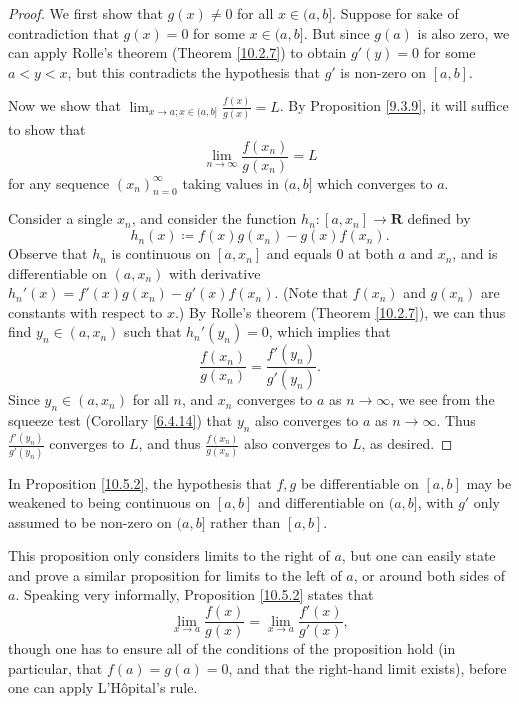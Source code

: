 \begin{proof}
    We first show that \(g(x) \neq 0\) for all \(x \in (a, b]\).
    Suppose for sake of contradiction that \(g(x) = 0\) for some \(x \in (a, b]\).
    But since \(g(a)\) is also zero, we can apply Rolle's theorem (Theorem \ref{10.2.7}) to obtain \(g'(y) = 0\) for some \(a < y < x\), but this contradicts the hypothesis that \(g'\) is non-zero on \([a, b]\).

    Now we show that \(\lim_{x \to a ; x \in (a, b]} \frac{f(x)}{g(x)} = L\).
    By Proposition \ref{9.3.9}, it will suffice to show that
    \[
        \lim_{n \to \infty} \frac{f(x_n)}{g(x_n)} = L
    \]
    for any sequence \((x_n)_{n = 0}^\infty\) taking values in \((a, b]\) which converges to \(a\).

    Consider a single \(x_n\), and consider the function \(h_n : [a, x_n] \to \mathbf{R}\) defined by
    \[
        h_n(x) \coloneqq f(x) g(x_n) - g(x) f(x_n).
    \]
    Observe that \(h_n\) is continuous on \([a, x_n]\) and equals \(0\) at both \(a\) and \(x_n\), and is differentiable on \((a, x_n)\) with derivative \(h_n'(x) = f'(x) g(x_n) - g'(x) f(x_n)\).
    (Note that \(f(x_n)\) and \(g(x_n)\) are constants with respect to \(x\).)
    By Rolle's theorem (Theorem \ref{10.2.7}), we can thus find \(y_n \in (a, x_n)\) such that \(h_n'(y_n) = 0\), which implies that
    \[
        \frac{f(x_n)}{g(x_n)} = \frac{f'(y_n)}{g'(y_n)}.
    \]
    Since \(y_n \in (a, x_n)\) for all \(n\), and \(x_n\) converges to \(a\) as \(n \to \infty\), we see from the squeeze test (Corollary \ref{6.4.14}) that \(y_n\) also converges to \(a\) as \(n \to \infty\).
    Thus \(\frac{f'(y_n)}{g'(y_n)}\) converges to \(L\), and thus \(\frac{f(x_n)}{g(x_n)}\) also converges to \(L\), as desired.
\end{proof}

\begin{note}
    In Proposition \ref{10.5.2}, the hypothesis that \(f, g\) be differentiable on \([a, b]\) may be weakened to being continuous on \([a, b]\) and differentiable on \((a, b]\), with \(g'\) only assumed to be non-zero on \((a, b]\) rather than \([a, b]\).
\end{note}

\begin{remark}\label{10.5.3}
    This proposition only considers limits to the right of \(a\), but one can easily state and prove a similar proposition for limits to the left of \(a\), or around both sides of \(a\).
    Speaking very informally, Proposition \ref{10.5.2} states that
    \[
        \lim_{x \to a} \frac{f(x)}{g(x)} = \lim_{x \to a} \frac{f'(x)}{g'(x)},
    \]
    though one has to ensure all of the conditions of the proposition hold (in particular, that \(f(a) = g(a) = 0\), and that the right-hand limit exists), before one can apply L'Hôpital's rule.
\end{remark}